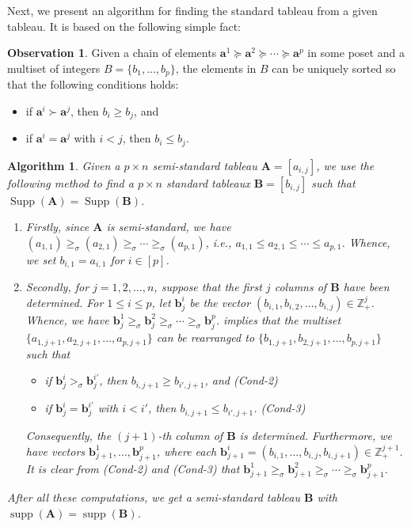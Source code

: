 \documentclass[11pt,a4paper,reqno,dvipsnames]{amsart}
\theoremstyle{plain}
\newtheorem{Algorithm}[Theorem]{Algorithm}
\theoremstyle{definition}
\newtheorem{Assumptions and Discussion}[Theorem]{Assumptions and Discussion}
\newtheorem{Observation}[Theorem]{Observation}
\theoremstyle{remark}
\def\supp{\operatorname{supp}}
\def\ZZ{{\mathbb Z}}
\newcommand\bda{{\bm a}}
\newcommand\bdB{{\bm B}}
\newcommand\bdb{{\bm b}}
\newcommand\bfA{\mathbf{A}}
\newcommand\bfB{\mathbf{B}}
\newcommand\Supp{\operatorname{Supp}}
\begin{document}
Next, we present an algorithm for finding the standard tableau from a given tableau. It is based on the following simple fact:

\begin{Observation}
    \label{obs_inc}
    Given a chain of elements $\bda^1 \succeq \bda^2 \succeq \cdots \succeq \bda^p$ in some poset and a multiset of integers $B=\{b_1,\dots,b_p\}$, the elements in $B$ can be uniquely sorted so that the following conditions holds:
    \begin{itemize}
        \item if $\bda^i \succ \bda^j$, then $b_i\ge b_j$, and
        \item if $\bda^i=\bda^j$ with $i<j$, then $b_i\le b_j$.
    \end{itemize}
\end{Observation}

\begin{Algorithm}
    \label{algo_standard_tab}
    Given a $p\times n$ semi-standard tableau $\bfA=[a_{i,j}]$, we use the following method to find a $p\times n$ standard tableaux $\bfB=[b_{i,j}]$ such that $\Supp(\bfA)=\Supp(\bfB)$.
    \begin{enumerate}[1]
        \item
            Firstly, since $\bfA$ is semi-standard, we have $(a_{1,1})\ge_{\sigma}(a_{2,1})\ge_{\sigma}\cdots \ge_{\sigma}(a_{p,1})$, i.e., $a_{1,1}\le a_{2,1} \le \cdots \le a_{p,1}$. Whence, we set $b_{i,1}=a_{i,1}$ for $i\in [p]$.
        \item Secondly, for $j=1,2,\dots,n$, suppose that the first $j$ columns of $\bfB$ have been determined. For $1\le i\le p$, let $\bdb^i_{j}$ be the vector $(b_{i,1},b_{i,2},\dots,b_{i,j})\in \ZZ_+^j$. Whence, we have $\bdb^1_{j} \ge_{\sigma} \bdb^2_{j} \ge_{\sigma}\cdots \ge_{\sigma} \bdb^p_{j}$.
         implies that the multiset $\{a_{1,j+1},a_{2,j+1},\dots,a_{p,j+1}\}$ can be rearranged to $\{b_{1,j+1},b_{2,j+1},\dots,b_{p,j+1}\}$ such that
            \begin{itemize}
                \item if $\bdb^i_{j}>_{\sigma} \bdb^{i'}_{j}$, then $b_{i,j+1}\ge b_{i',j+1}$, and \hfill \textup{(Cond-2)}
                \item if $\bdb^i_{j}=\bdb^{i'}_{j}$ with $i<i'$, then $b_{i,j+1} \le b_{i',j+1}$. \hfill \textup{(Cond-3)}
            \end{itemize}
            Consequently, the $(j+1)$-th column of $\bdB$ 
            is determined. Furthermore, we have vectors $\bdb^1_{j+1},\dots,\bdb^p_{j+1}$, where each $\bdb^i_{j+1}=(b_{i,1},\dots,b_{i,j},b_{i,j+1})\in \ZZ_+^{j+1}$.
            It is clear from \textup{(Cond-2)} and \textup{(Cond-3)} that $\bdb^1_{j+1} \ge_{\sigma} \bdb^2_{j+1} \ge_{\sigma} \cdots \ge_{\sigma} \bdb^p_{j+1}$.
    \end{enumerate}
    After all these computations, we get a semi-standard tableau $\bfB$ with $\supp(\bfA)=\supp(\bfB)$.
\end{Algorithm}
\end{document}
